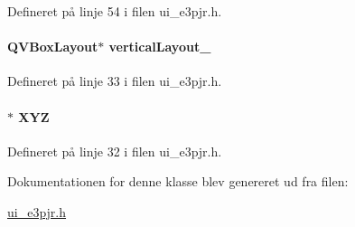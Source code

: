 Defineret på linje 54 i filen ui\+\_\+e3pjr.\+h.

\paragraph[{\texorpdfstring{vertical\+Layout\+\_\+9}{verticalLayout_9}}]{\setlength{\rightskip}{0pt plus 5cm}Q\+V\+Box\+Layout$\ast$ vertical\+Layout\+\_\hspace{0.3cm}{\ttfamily [inherited]}}\hypertarget{class_ui___e3_p_j_r_a7c00a0b53a83fa0709131b996a6249a9}{}\label{class_ui___e3_p_j_r_a7c00a0b53a83fa0709131b996a6249a9}


Defineret på linje 33 i filen ui\+\_\+e3pjr.\+h.

\paragraph[{\texorpdfstring{X\+YZ}{XYZ}}]{$\ast$ X\+YZ\hspace{0.3cm}{\ttfamily [inherited]}}\hypertarget{class_ui___e3_p_j_r_a098a80b873d9e0a09fd834f09e5028b4}{}\label{class_ui___e3_p_j_r_a098a80b873d9e0a09fd834f09e5028b4}


Defineret på linje 32 i filen ui\+\_\+e3pjr.\+h.



Dokumentationen for denne klasse blev genereret ud fra filen\+:\begin{DoxyCompactItemize}
\item 
\hyperlink{ui__e3pjr_8h}{ui\+\_\+e3pjr.\+h}\end{DoxyCompactItemize}
